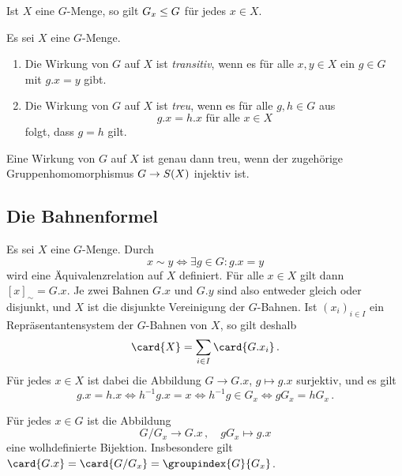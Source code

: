 \begin{lemma}
  Ist $X$ eine $G$-Menge, so gilt $G_x \mathrel{\leq} G$ für jedes $x \in X$.
\end{lemma}

\begin{definition}
  Es sei $X$ eine $G$-Menge.
  \begin{enumerate}
    \item
      Die Wirkung von $G$ auf $X$ ist \emph{transitiv}, wenn es für alle $x, y \in X$ ein $g \in G$ mit $g.x = y$ gibt.
    \item
      Die Wirkung von $G$ auf $X$ ist \emph{treu}, wenn es für alle $g, h \in G$ aus
      \[
        \text{$g.x = h.x$ für alle $x \in X$}
      \]
      folgt, dass $g = h$ gilt.
  \end{enumerate}
\end{definition}

\begin{remark}
  Eine Wirkung von $G$ auf $X$ ist genau dann treu, wenn der zugehörige Gruppenhomomorphismus $G \to S(X)$ injektiv ist.
\end{remark}




\subsection{Die Bahnenformel}

Es sei $X$ eine $G$-Menge.
Durch
\[
        x \sim y
  \iff  \exists g \in G: g.x = y
\]
wird eine Äquivalenzrelation auf $X$ definiert.
Für alle $x \in X$ gilt dann $[x]_{\sim} = G.x$.
Je zwei Bahnen $G.x$ und $G.y$ sind also entweder gleich oder disjunkt, und $X$ ist die disjunkte Vereinigung der $G$-Bahnen.
Ist $(x_i)_{i \in I}$ ein Repräsentantensystem der $G$-Bahnen von $X$, so gilt deshalb
\begin{equation}
\label{equation: orbit formula alpha}
    \card{X}
  = \sum_{i \in I} \card{G.x_i} \,.
\end{equation}
Für jedes $x \in X$ ist dabei die Abbildung $G \to G.x$, $g \mapsto g.x$ surjektiv, und es gilt
\[
        g.x = h.x
  \iff  h^{-1}g.x = x
  \iff  h^{-1} g \in G_x
  \iff  g G_x = h G_x \,.
\]

\begin{lemma}
  Für jedes $x \in G$ ist die Abbildung
  \[
            G/G_x
    \to     G.x \,,
    \quad   g G_x
    \mapsto g.x
  \]
  eine wolhdefinierte Bijektion.
  Insbesondere gilt $\card{G.x} = \card{G/G_x} = \groupindex{G}{G_x}$.
\end{lemma}

